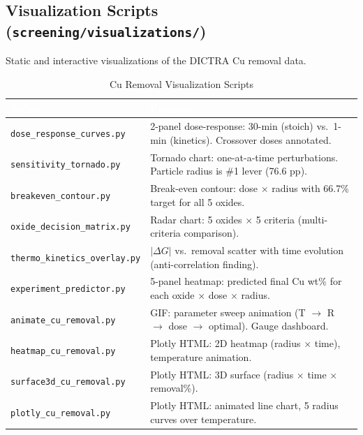 \documentclass[11pt]{article}
\begin{document}
\subsection{Visualization Scripts (\texttt{screening/visualizations/})}

Static and interactive visualizations of the DICTRA Cu removal data.

\begin{table}[H]
\caption{Cu Removal Visualization Scripts}
\label{tab:viz_scripts}
\centering
\renewcommand{\arraystretch}{1.15}
\footnotesize
\begin{tabular}{|p{2.8in}|p{3.2in}|}
\hline
\rowcolor{headercolor}
\textcolor{white}{\textbf{Script}} & \textcolor{white}{\textbf{Purpose}} \\
\hline
\texttt{dose\_response\_curves.py} & 2-panel dose-response: 30-min (stoich) vs.\ 1-min (kinetics). Crossover doses annotated. \\
\hline
\rowcolor{altrow}
\texttt{sensitivity\_tornado.py} & Tornado chart: one-at-a-time perturbations. Particle radius is \#1 lever (76.6 pp). \\
\hline
\texttt{breakeven\_contour.py} & Break-even contour: dose $\times$ radius with 66.7\% target for all 5 oxides. \\
\hline
\rowcolor{altrow}
\texttt{oxide\_decision\_matrix.py} & Radar chart: 5 oxides $\times$ 5 criteria (multi-criteria comparison). \\
\hline
\texttt{thermo\_kinetics\_overlay.py} & $|\Delta G|$ vs.\ removal scatter with time evolution (anti-correlation finding). \\
\hline
\rowcolor{altrow}
\texttt{experiment\_predictor.py} & 5-panel heatmap: predicted final Cu wt\% for each oxide $\times$ dose $\times$ radius. \\
\hline
\texttt{animate\_cu\_removal.py} & GIF: parameter sweep animation (T $\to$ R $\to$ dose $\to$ optimal). Gauge dashboard. \\
\hline
\rowcolor{altrow}
\texttt{heatmap\_cu\_removal.py} & Plotly HTML: 2D heatmap (radius $\times$ time), temperature animation. \\
\hline
\texttt{surface3d\_cu\_removal.py} & Plotly HTML: 3D surface (radius $\times$ time $\times$ removal\%). \\
\hline
\rowcolor{altrow}
\texttt{plotly\_cu\_removal.py} & Plotly HTML: animated line chart, 5 radius curves over temperature. \\
\hline
\end{tabular}
\end{table}
\end{document}
